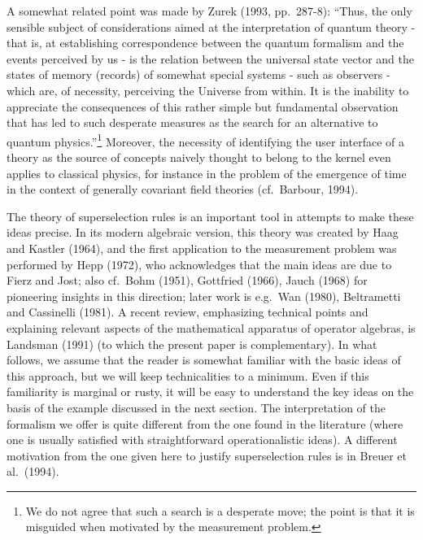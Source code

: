 \documentclass[12pt,titlepage]{article}
\newcommand{\fn}{\footnote}
\begin{document}
A somewhat related  point was made   by Zurek  (1993, pp.\ 287-8): ``Thus, the
only sensible
subject of considerations aimed at the interpretation of quantum theory - that
is, at establishing
correspondence between the quantum formalism and the events perceived by us -
is the relation
between the universal state vector and the states of memory (records) of
somewhat special systems -
such as observers - which are, of necessity, perceiving the Universe from
within. It is the
inability to appreciate the consequences of this rather simple but fundamental
observation that has
led to such desperate measures as the search for an alternative to quantum
physics.''\fn{We do not
agree that such a search is a desperate move; the point is that it is misguided
when motivated
by the measurement problem.}
 Moreover,
the necessity of identifying the user interface of a theory as the source of
concepts naively
thought to belong to the kernel even applies to classical physics, for instance
in the problem of the
emergence of time in the context of  generally covariant field theories (cf.\
Barbour, 1994).

The theory of superselection rules is an important tool in attempts to make
these ideas precise. In
its modern algebraic version, this theory was created by Haag and Kastler
(1964), and the first
application to the measurement problem was performed by Hepp (1972), who
acknowledges that the
main ideas are due to Fierz and Jost; also cf.\  Bohm (1951), Gottfried (1966),
Jauch (1968) for
pioneering insights in this direction;
later work   is e.g.\ Wan (1980), Beltrametti and Cassinelli (1981). A recent
review, emphasizing
technical points and explaining relevant aspects of the mathematical apparatus
of operator algebras,
is Landsman (1991) (to which the present paper is complementary). In what
follows, we assume that the
reader is somewhat familiar with the basic ideas of this approach, but we will
keep technicalities to
a minimum.  Even if this familiarity is marginal or rusty, it will be easy to
understand the key
ideas on the basis of the example discussed in the next section.
The interpretation of the formalism we offer is quite different from the one
found in the literature
(where one is usually satisfied with straightforward operationalistic ideas). A
different motivation
from the one given here to justify superselection rules is in Breuer et al.\
(1994).
\end{document}
